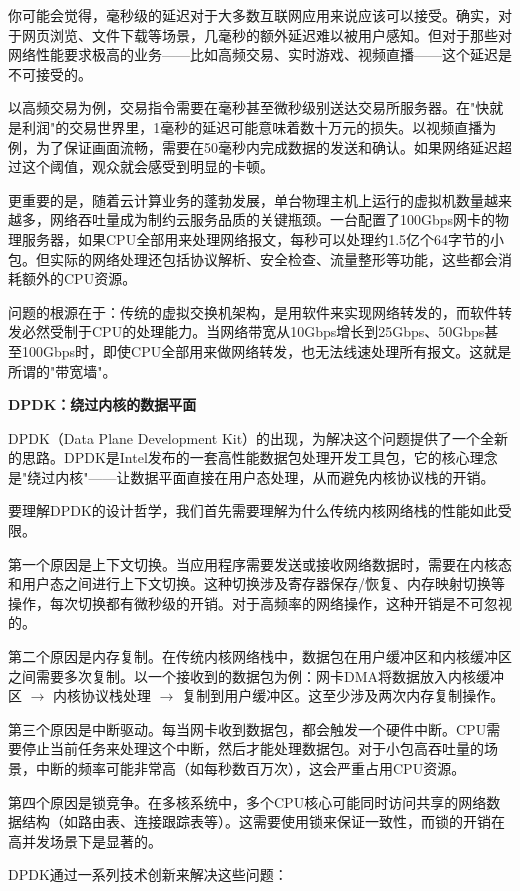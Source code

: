 你可能会觉得，毫秒级的延迟对于大多数互联网应用来说应该可以接受。确实，对于网页浏览、文件下载等场景，几毫秒的额外延迟难以被用户感知。但对于那些对网络性能要求极高的业务——比如高频交易、实时游戏、视频直播——这个延迟是不可接受的。

以高频交易为例，交易指令需要在毫秒甚至微秒级别送达交易所服务器。在"快就是利润"的交易世界里，1毫秒的延迟可能意味着数十万元的损失。以视频直播为例，为了保证画面流畅，需要在50毫秒内完成数据的发送和确认。如果网络延迟超过这个阈值，观众就会感受到明显的卡顿。

更重要的是，随着云计算业务的蓬勃发展，单台物理主机上运行的虚拟机数量越来越多，网络吞吐量成为制约云服务品质的关键瓶颈。一台配置了100Gbps网卡的物理服务器，如果CPU全部用来处理网络报文，每秒可以处理约1.5亿个64字节的小包。但实际的网络处理还包括协议解析、安全检查、流量整形等功能，这些都会消耗额外的CPU资源。

问题的根源在于：传统的虚拟交换机架构，是用软件来实现网络转发的，而软件转发必然受制于CPU的处理能力。当网络带宽从10Gbps增长到25Gbps、50Gbps甚至100Gbps时，即使CPU全部用来做网络转发，也无法线速处理所有报文。这就是所谓的"带宽墙"。

\textbf{DPDK：绕过内核的数据平面}

DPDK（Data Plane Development Kit）的出现，为解决这个问题提供了一个全新的思路。DPDK是Intel发布的一套高性能数据包处理开发工具包，它的核心理念是"绕过内核"——让数据平面直接在用户态处理，从而避免内核协议栈的开销。

要理解DPDK的设计哲学，我们首先需要理解为什么传统内核网络栈的性能如此受限。

第一个原因是上下文切换。当应用程序需要发送或接收网络数据时，需要在内核态和用户态之间进行上下文切换。这种切换涉及寄存器保存/恢复、内存映射切换等操作，每次切换都有微秒级的开销。对于高频率的网络操作，这种开销是不可忽视的。

第二个原因是内存复制。在传统内核网络栈中，数据包在用户缓冲区和内核缓冲区之间需要多次复制。以一个接收到的数据包为例：网卡DMA将数据放入内核缓冲区 $\rightarrow$ 内核协议栈处理 $\rightarrow$ 复制到用户缓冲区。这至少涉及两次内存复制操作。

第三个原因是中断驱动。每当网卡收到数据包，都会触发一个硬件中断。CPU需要停止当前任务来处理这个中断，然后才能处理数据包。对于小包高吞吐量的场景，中断的频率可能非常高（如每秒数百万次），这会严重占用CPU资源。

第四个原因是锁竞争。在多核系统中，多个CPU核心可能同时访问共享的网络数据结构（如路由表、连接跟踪表等）。这需要使用锁来保证一致性，而锁的开销在高并发场景下是显著的。

DPDK通过一系列技术创新来解决这些问题：

